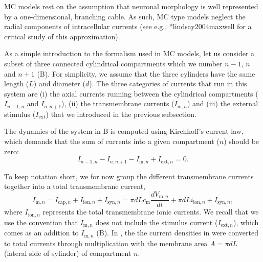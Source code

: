 MC models rest on the assumption that neuronal morphology is well represented by a one-dimensional, branching cable. As such, MC type models neglect the radial components of intracellular currents (see e.g., \citeasnoun**{lindsay2004maxwell} for a critical study of this approximation). 

As a simple introduction to the formalism used in MC models, let us consider a subset of three connected cylindrical compartments which we number $n-1$, $n$ and $n+1$ (B). For simplicity, we assume that the three cylinders have the same length ($L$) and diameter ($d$). The three categories of currents that run in this system are (i) the axial currents running between the cylindrical compartments ($I_{n-1,n}$ and $I_{n,n+1}$), (ii) the transmembrane currents ($I_{\mathrm{m},n}$) and (iii) the external stimulus ($I_\mathrm{ext}$) that we introduced in the previous subsection. 


The dynamics of the system in B  is computed using Kirchhoff's current law, which demands that the sum of currents into a given compartment ($n$) should be zero:
\begin{equation}
I_{n-1,n} - I_{n,n+1} - I_{\mathrm{m},n} + I_{\mathrm{ext},n} = 0.
\label{eq:Neuron:Kirch}
\end{equation}

To keep notation short, we for now group the different transmembrane currents together into a total transmembrane current,
\begin{equation}
I_{\mathrm{m},n} = I_{\mathrm{cap},n} + I_{\mathrm{ion},n} + I_{\mathrm{syn},n} = \pi d L c_\text{m} \frac{dV_{\mathrm{m},n}}{dt} + \pi d L i_{\mathrm{ion},n}  + I_{\mathrm{syn},n}, 
\label{eq:Neuron:Imemb}
\end{equation}
where $I_{\mathrm{ion},n}$ represents the total transmembrane ionic currents. We recall that we use the convention that $I_{\mathrm{m},n}$ does not include the stimulus current ($I_{\mathrm{ext},n}$), which comes as an addition to $I_{\mathrm{m},n}$ (B). In , the the current densities in  were converted to total currents through multiplication with the membrane area $A=\pi d L$ (lateral side of sylinder) of compartment $n$.

